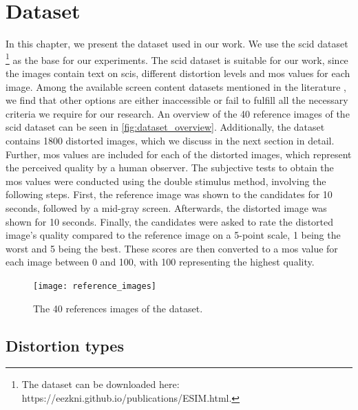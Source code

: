 \chapter{Dataset}
\label{chap:dataset}
In this chapter, we present the dataset used in our work.
We use the \gls{scid} dataset \cite{ni_esim_2017}\footnote{The dataset can be downloaded here: https://eezkni.github.io/publications/ESIM.html.} as the base for our experiments.
The \gls{scid} dataset is suitable for our work, since the images contain text on \glspl{sci}, different distortion levels and \gls{mos} values for each image.
Among the available screen content datasets mentioned in the literature \cite{iqa_survey_2020}, we find that other options are either inaccessible or fail to fulfill all the necessary criteria we require for our research.
An overview of the 40 reference images of the \gls{scid} dataset can be seen in \autoref{fig:dataset_overview}.
Additionally, the dataset contains 1800 distorted images, which we discuss in the next section in detail.
Further, \gls{mos} values are included for each of the distorted images, which represent the perceived quality by a human observer.
The subjective tests to obtain the \gls{mos} values were conducted using the double stimulus method, involving the following steps.
First, the reference image was shown to the candidates for 10 seconds, followed by a mid-gray screen.
Afterwards, the distorted image was shown for 10 seconds.
Finally, the candidates were asked to rate the distorted image's quality compared to the reference image on a 5-point scale, 1 being the worst and 5 being the best.
These scores are then converted to a \gls{mos} value for each image between 0 and 100, with 100 representing the highest quality.
\begin{figure}
    \centering
    \texttt{[image: reference\_images]}
    \caption{The 40 references images of the dataset.}
    \label{fig:dataset_overview}
\end{figure}


\section{Distortion types}
\label{sec:dataset_distortion_types}


